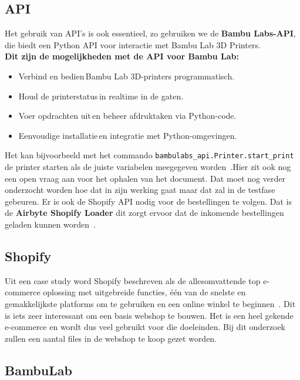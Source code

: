 \subsection{API}%

Het gebruik van API’s is ook essentieel, zo gebruiken we de \textbf{Bambu Labs-API}, die biedt een Python API voor interactie met Bambu Lab 3D Printers.\\

\textbf{Dit zijn de mogelijkheden met de API voor Bambu Lab:}

\begin{itemize}
\item Verbind en bedien Bambu Lab 3D-printers programmatisch. 
\item Houd de printerstatus in realtime in de gaten. 
\item Voer opdrachten uit en beheer afdruktaken via Python-code. 
\item Eenvoudige installatie en integratie met Python\--omgevingen. 
\end{itemize}

Het kan bijvoorbeeld met het commando \texttt{bambulabs\_api.Printer.start\_print} de printer s\-tarten als  de juiste variabelen meegegeven worden~\autocite{bambulabsAPI}.Hier zit ook nog een open vraag aan voor het ophalen van het document. Dat moet nog verder onderzocht worden hoe dat in zijn werking gaat maar dat zal in de testfase gebeuren.  Er is ook de Shopify API nodig voor de bestellingen te volgen. Dat is de \textbf{Airbyte Shopify Loader} dit zorgt ervoor dat de inkomende bestellingen geladen kunnen worden~\autocite{ilamaIndexShopify}. 



\subsection{Shopify}%

Uit een case study word Shopify beschreven als de allesomvattende top e-commerce oplossing met uitgebreide functies, één van de snelste en gemakkelijkste platforms om te gebruiken en een online winkel te beginnen~\autocite{bang2024}. Dit is iets zeer interessant om een basis webshop te bouwen. Het is een heel gekende e-commerce en wordt dus veel gebruikt voor die doeleinden. Bij dit onderzoek zullen een aantal files in de webshop te koop gezet worden.

\subsection{BambuLab}%

